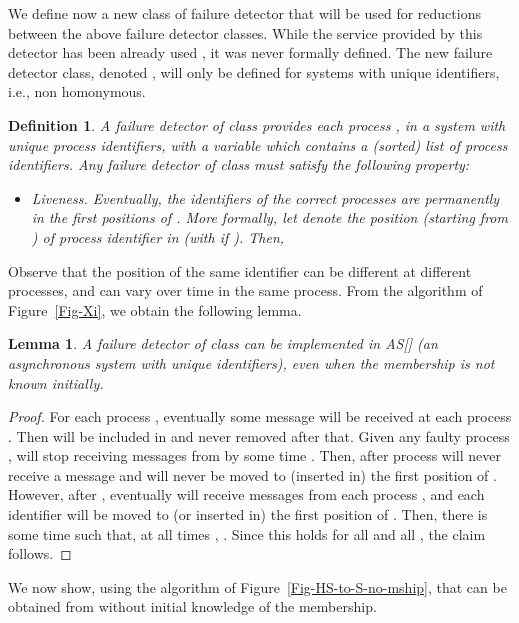 \documentclass[10pt, conference, compsocconf]{IEEEtran}
\newtheorem{definition}{Definition}
\newtheorem{lemma}{Lemma}
\begin{document}
We define now a new class of failure detector that will be used for reductions between the above failure detector classes.
While the service provided by this detector has been already used \cite{DBLP:conf/podc/Zielinski08,DBLP:conf/wdag/BonnetR10}, it was never formally
defined. The new failure detector class, denoted , will only be defined for systems with unique identifiers, i.e., non homonymous.

\begin{definition}
A failure detector of class  provides each process  , in a system with unique process identifiers, with a variable  which contains a (sorted) list of process identifiers. 
Any failure detector of class  must satisfy the following property:
\begin{itemize}
\item Liveness.
 Eventually, the identifiers of the correct processes 
are permanently in the first positions of . More formally,
 let  denote the position (starting from ) of process identifier  in  
 (with  if ). Then,
 
 \end{itemize}
\end{definition}

Observe that 
the position of the same identifier can be different at different processes, and can vary over time in the same process.
From the algorithm of Figure~\ref{Fig-Xi}, we obtain the following lemma.

\begin{lemma}
\label{l-Xi}
A failure detector of class  can be implemented in AS[] (an asynchronous system with unique identifiers), even when the membership is not known initially.
\end{lemma}
\begin{proof}
For each process , eventually some message  will be received at each process . Then  will be included in  and never removed after that. Given any faulty process ,  will stop receiving messages from  by some time . Then, after  process  will never receive a message  and  will never be moved to (inserted in) the first position of . However, after , eventually  will receive messages  from each process , and each identifier  will be moved to (or inserted in) the first position of . Then, there is some time  such that, at all times , . Since this holds for all  and all , the claim follows.
\end{proof}

We now show, using the algorithm of  Figure~\ref{Fig-HS-to-S-no-mship}, that  can be obtained from  without initial knowledge of the membership. 
\end{document}

